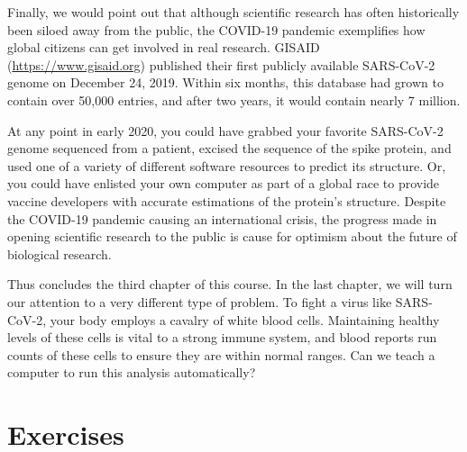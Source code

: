 Finally, we would point out that although scientific research has often historically been siloed away from the public, the COVID-19 pandemic exemplifies how global citizens can get involved in real research. GISAID (\url{https://www.gisaid.org}) published their first publicly available SARS-CoV-2 genome on December 24, 2019. Within six months, this database had grown to contain over 50,000 entries, and after two years, it would contain nearly 7 million.

At any point in early 2020, you could have grabbed your favorite SARS-CoV-2 genome sequenced from a patient, excised the sequence of the spike protein, and used one of a variety of different software resources to predict its structure. Or, you could have enlisted your own computer as part of a global race to provide vaccine developers with accurate estimations of the protein's structure. Despite the COVID-19 pandemic causing an international crisis, the progress made in opening scientific research to the public is cause for optimism about the future of biological research.

Thus concludes the third chapter of this course. In the last chapter, we will turn our attention to a very different type of problem. To fight a virus like SARS-CoV-2, your body employs a cavalry of white blood cells. Maintaining healthy levels of these cells is vital to a strong immune system, and blood reports run counts of these cells to ensure they are within normal ranges. Can we teach a computer to run this analysis automatically?

\begin{note}\end{note}

\FloatBarrier
\section{Exercises}
\label{sec:coronavirus_exercises}

\begin{exercise}\end{exercise}
